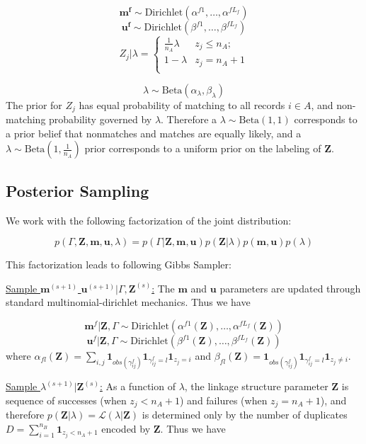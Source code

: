 \documentclass[
  12pt,
]{article}
\begin{document}
\[\mathbf{m^{f}} \sim \text{Dirichlet}(\alpha^{f1}, \ldots, \alpha^{fL_f})\]
\[\mathbf{u^{f}} \sim \text{Dirichlet}(\beta^{f1}, \ldots, \beta^{fL_f})\]
\[Z_j | \lambda =
\begin{cases} 
    \frac{1}{n_A}\lambda  & z_j \leq n_A; \\
     1-\lambda &  z_j  = n_A + 1 \\
\end{cases}\]

\[\lambda \sim \text{Beta}(\alpha_{\lambda}, \beta_{\lambda}) \] The
prior for \(Z_j\) has equal probability of matching to all records
\(i\in A\), and non-matching probability governed by \(\lambda\).
Therefore a \(\lambda \sim \text{Beta}(1, 1)\) corresponds to a prior
belief that nonmatches and matches are equally likely, and a
\(\lambda \sim \text{Beta}(1, \frac{1}{n_A})\) prior corresponds to a
uniform prior on the labeling of \(\mathbf{Z}\).

\hypertarget{posterior-sampling}{%
\subsection{Posterior Sampling}\label{posterior-sampling}}

We work with the following factorization of the joint distribution:

\[p(\Gamma, \mathbf{Z}, \mathbf{m}, \mathbf{u}, \lambda) = p(\Gamma|\mathbf{Z}, \mathbf{m}, \mathbf{u}) p(\mathbf{Z} | \lambda) p(\mathbf{m}, \mathbf{u}) p(\lambda)\]

This factorization leads to following Gibbs Sampler:

\underline{Sample $\mathbf{m}^{(s+1)}$ $\mathbf{u}^{(s+1)}|\Gamma, \mathbf{Z}^{(s)}$:}
The \(\mathbf{m}\) and \(\mathbf{u}\) parameters are updated through
standard multinomial-dirichlet mechanics. Thus we have

\[\mathbf{m}^f|\mathbf{Z}, \Gamma \sim \text{Dirichlet}(\alpha^{f1}(\mathbf{Z}), \ldots, \alpha^{fL_f}(\mathbf{Z}))\]
\[\mathbf{u}^f|\mathbf{Z}, \Gamma \sim \text{Dirichlet}(\beta^{f1}(\mathbf{Z}), \ldots, \beta^{fL_f}(\mathbf{Z}))\]
where
\(\alpha_{fl}(\mathbf{Z})= \sum_{i,j} \mathbf{1}_{obs(\gamma_{ij}^f)}\mathbf{1}_{\gamma_{ij}^f = l} \mathbf{1}_{z_j = i}\)
and
\(\beta_{fl}(\mathbf{Z})= \mathbf{1}_{obs(\gamma_{ij}^f)}\mathbf{1}_{\gamma_{ij}^f = l} \mathbf{1}_{z_j \neq i}\).

\underline{Sample $\lambda^{(s+1)}|\mathbf{Z}^{(s)}$:} As a function of
\(\lambda\), the linkage structure parameter \(\mathbf{Z}\) is sequence
of successes (when \(z_j < n_A + 1\)) and failures (when
\(z_j = n_A + 1\)), and therefore
\(p(\mathbf{Z}|\lambda) = \mathcal{L}(\lambda|\mathbf{Z})\) is
determined only by the number of duplicates
\(D = \sum_{i=1}^{n_B}\mathbf{1}_{z_j < n_A + 1}\) encoded by
\(\mathbf{Z}\). Thus we have
\end{document}
